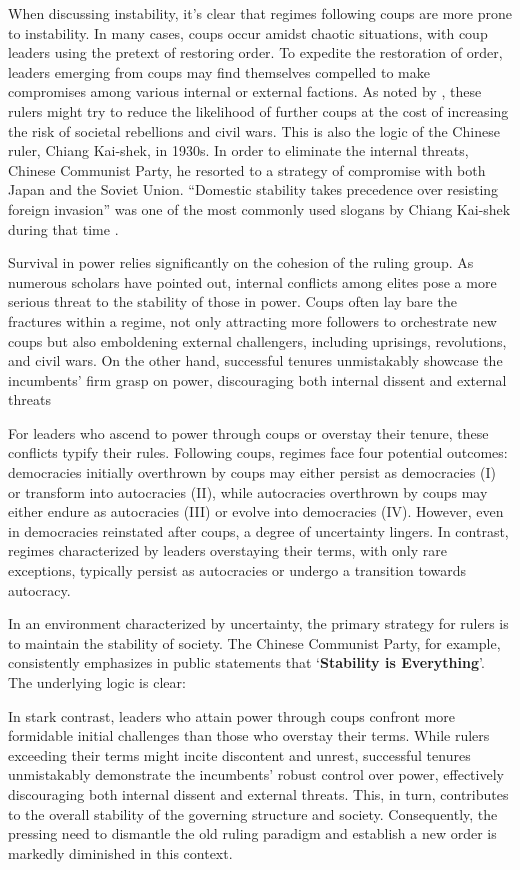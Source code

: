 \documentclass[
  12pt,
  a4paper,
  12pt]{article}
\begin{document}
When discussing instability, it's clear that regimes following coups are
more prone to instability. In many cases, coups occur amidst chaotic
situations, with coup leaders using the pretext of restoring order. To
expedite the restoration of order, leaders emerging from coups may find
themselves compelled to make compromises among various internal or
external factions. As noted by \citet{roessler2011}, these rulers might
try to reduce the likelihood of further coups at the cost of increasing
the risk of societal rebellions and civil wars. This is also the logic
of the Chinese ruler, Chiang Kai-shek, in 1930s. In order to eliminate
the internal threats, Chinese Communist Party, he resorted to a strategy
of compromise with both Japan and the Soviet Union. ``Domestic stability
takes precedence over resisting foreign invasion'' was one of the most
commonly used slogans by Chiang Kai-shek during that time
\citet{chu1999chiang}.

Survival in power relies significantly on the cohesion of the ruling
group. As numerous scholars have pointed out, internal conflicts among
elites pose a more serious threat to the stability of those in power.
Coups often lay bare the fractures within a regime, not only attracting
more followers to orchestrate new coups but also emboldening external
challengers, including uprisings, revolutions, and civil wars. On the
other hand, successful tenures unmistakably showcase the incumbents'
firm grasp on power, discouraging both internal dissent and external
threats

For leaders who ascend to power through coups or overstay their tenure,
these conflicts typify their rules. Following coups, regimes face four
potential outcomes: democracies initially overthrown by coups may either
persist as democracies (I) or transform into autocracies (II), while
autocracies overthrown by coups may either endure as autocracies (III)
or evolve into democracies (IV). However, even in democracies reinstated
after coups, a degree of uncertainty lingers. In contrast, regimes
characterized by leaders overstaying their terms, with only rare
exceptions, typically persist as autocracies or undergo a transition
towards autocracy.

In an environment characterized by uncertainty, the primary strategy for
rulers is to maintain the stability of society. The Chinese Communist
Party, for example, consistently emphasizes in public statements that
`\textbf{Stability is Everything}'. The underlying logic is clear:

In stark contrast, leaders who attain power through coups confront more
formidable initial challenges than those who overstay their terms. While
rulers exceeding their terms might incite discontent and unrest,
successful tenures unmistakably demonstrate the incumbents' robust
control over power, effectively discouraging both internal dissent and
external threats. This, in turn, contributes to the overall stability of
the governing structure and society. Consequently, the pressing need to
dismantle the old ruling paradigm and establish a new order is markedly
diminished in this context.
\end{document}
